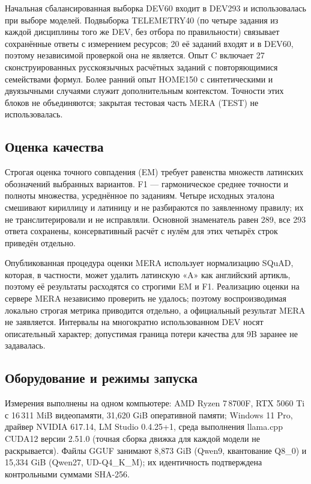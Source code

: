 \documentclass[14pt,a4paper]{extarticle}
\begin{document}
Начальная сбалансированная выборка DEV60 входит в DEV293 и использовалась при выборе моделей. Подвыборка TELEMETRY40 (по четыре задания из каждой дисциплины того же DEV, без отбора по правильности) связывает сохранённые ответы с измерением ресурсов; 20 её заданий входят и в DEV60, поэтому независимой проверкой она не является. Опыт C включает 27 сконструированных русскоязычных расчётных заданий с повторяющимися семействами формул. Более ранний опыт HOME150 с синтетическими и двуязычными случаями служит дополнительным контекстом. Точности этих блоков не объединяются; закрытая тестовая часть MERA (TEST) не использовалась.

\subsection*{Оценка качества}
Строгая оценка точного совпадения (EM) требует равенства множеств латинских обозначений выбранных вариантов. F1 — гармоническое среднее точности и полноты множества, усреднённое по заданиям. Четыре исходных эталона смешивают кириллицу и латиницу и не разбираются по заявленному правилу; их не транслитерировали и не исправляли. Основной знаменатель равен 289, все 293 ответа сохранены, консервативный расчёт с нулём для этих четырёх строк приведён отдельно.

Опубликованная процедура оценки MERA использует нормализацию SQuAD, которая, в частности, может удалить латинскую «A» как английский артикль, поэтому её результаты расходятся со строгими EM и F1. Реализацию оценки на сервере MERA независимо проверить не удалось; поэтому воспроизводимая локально строгая метрика приводится отдельно, а официальный результат MERA не заявляется. Интервалы на многократно использованном DEV носят описательный характер; допустимая граница потери качества для 9B заранее не задавалась.

\subsection*{Оборудование и режимы запуска}
Измерения выполнены на одном компьютере: AMD Ryzen 7\,8700F, RTX 5060 Ti с 16\,311 MiB видеопамяти, 31,620 GiB оперативной памяти; Windows 11 Pro, драйвер NVIDIA 617.14, LM Studio 0.4.25+1, среда выполнения llama.cpp CUDA12 версии 2.51.0 (точная сборка движка для каждой модели не раскрывается). Файлы GGUF занимают 8,873 GiB (Qwen9, квантование Q8\_0) и 15,334 GiB (Qwen27, UD-Q4\_K\_M); их идентичность подтверждена контрольными суммами SHA-256.
\end{document}
